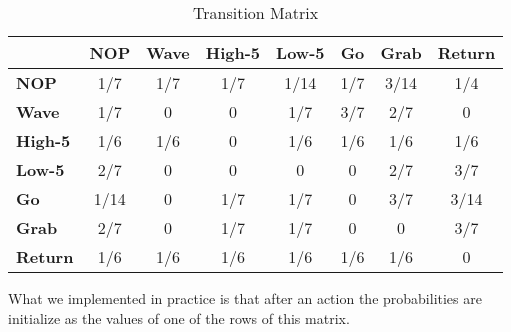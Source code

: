 \begin{table*}[t]
\centering
\caption{Transition Matrix}
\label{transition_matrix}
\begin{tabular}{|l|ccccccc|}
\hline
 & \multicolumn{1}{c|}{\textbf{NOP}} & \multicolumn{1}{c|}{\textbf{Wave}} & \multicolumn{1}{c|}{\textbf{High-5}} & \multicolumn{1}{c|}{\textbf{Low-5}} & \multicolumn{1}{c|}{\textbf{Go}} & \multicolumn{1}{c|}{\textbf{Grab}} & \textbf{Return} \\ \hline
\textbf{NOP} & 1/7 & 1/7 & 1/7 & 1/14 & 1/7 & 3/14 & 1/4 \\ \cline{1-1}
\textbf{Wave} & 1/7 & 0 & 0 & 1/7 & 3/7 & 2/7 & 0 \\ \cline{1-1}
\textbf{High-5} & 1/6 & 1/6 & 0 & 1/6 & 1/6 & 1/6 & 1/6 \\ \cline{1-1}
\textbf{Low-5} & 2/7 & 0 & 0 & 0 & 0 & 2/7 & 3/7 \\ \cline{1-1}
\textbf{Go} & 1/14 & 0 & 1/7 & 1/7 & 0 & 3/7 & 3/14 \\ \cline{1-1}
\textbf{Grab} & 2/7 & 0 & 1/7 & 1/7 & 0 & 0 & 3/7 \\ \cline{1-1}
\textbf{Return} & 1/6 & 1/6 & 1/6 & 1/6 & 1/6 & 1/6 & 0 \\ \hline
\end{tabular}
\end{table*}

What we implemented in practice is that after an action the probabilities are initialize as the values of one of the rows of this matrix.
